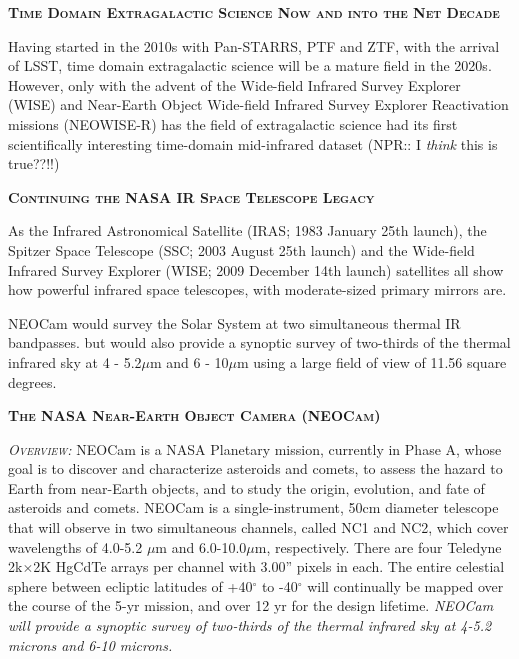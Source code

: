 \documentclass[12pt]{article}
\begin{document}
\smallskip
\smallskip
\noindent
{\bfseries \textsc{\textcolor{Cerulean}{Time Domain Extragalactic Science Now and into the Net Decade}}}

\smallskip
\noindent
Having started in the 2010s with Pan-STARRS, PTF and ZTF, with the arrival of LSST, time domain extragalactic science will be a mature field in the 2020s. However, only with the advent of the Wide-field Infrared Survey Explorer (WISE) and Near-Earth Object Wide-field Infrared Survey Explorer Reactivation missions (NEOWISE-R) has the field of extragalactic science had its first scientifically interesting time-domain mid-infrared dataset (NPR:: I {\it think} this is true??!!)


\smallskip
\smallskip
\noindent
{\bfseries \textsc{\textcolor{Cerulean}{Continuing the NASA IR Space Telescope Legacy}}} 

\smallskip
\noindent
As the Infrared Astronomical Satellite (IRAS; 1983 January 25th launch), 
the Spitzer Space Telescope (SSC; 2003 August 25th launch) and the Wide-field
Infrared Survey Explorer (WISE; 2009 December 14th launch) satellites all show 
how powerful infrared space telescopes, with moderate-sized primary mirrors are.

\smallskip
\smallskip
\noindent
NEOCam would survey the Solar System at two simultaneous thermal IR bandpasses. 
but would also provide a synoptic survey of two-thirds of the thermal infrared sky at 4 - 5.2$\mu$m and  6 - 10$\mu$m using a large field of view of 11.56 square degrees. 





\smallskip
\smallskip
\noindent
{\bfseries \textsc{\textcolor{Cerulean}{The NASA Near-Earth Object Camera (NEOCam)}}}

\textsl{\textsc{Overview:}}
NEOCam is a NASA Planetary mission, currently in Phase A, whose goal
is to discover and characterize asteroids and comets, to assess the
hazard to Earth from near-Earth objects, and to study the origin,
evolution, and fate of asteroids and comets. NEOCam is a
single-instrument, 50cm diameter telescope that will observe in two
simultaneous channels, called NC1 and NC2, which cover wavelengths of
4.0-5.2 $\mu$m and 6.0-10.0$\mu$m, respectively. There are four Teledyne
2k$\times$2K HgCdTe arrays per channel with 3.00'' pixels in each. The entire
celestial sphere between ecliptic latitudes of +40$^{\circ}$ to -40$^{\circ}$ will
continually be mapped over the course of the 5-yr mission, and over 12
yr for the design lifetime. 
{\it NEOCam will provide a synoptic survey of two-thirds of the thermal infrared sky at 4-5.2 microns and 6-10 microns.}
\end{document}
